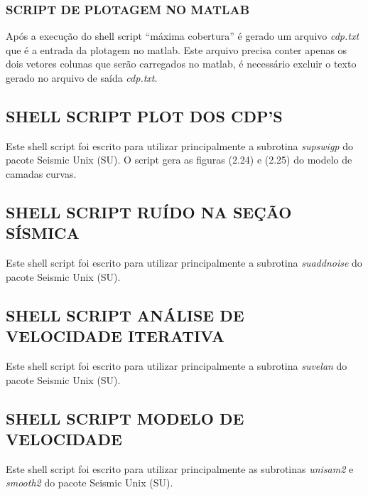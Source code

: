 \subsubsection*{SCRIPT DE PLOTAGEM NO MATLAB}
Após a execução do shell script ``máxima cobertura'' é gerado um arquivo \textit{cdp.txt} que é a entrada da plotagem no matlab. Este arquivo precisa conter apenas os dois vetores colunas que serão carregados no matlab, é necessário excluir o texto gerado no arquivo de saída \textit{cdp.txt}.


\newpage
\subsection{SHELL SCRIPT PLOT DOS CDP'S}
\label{apendice_I}
Este shell script foi escrito para utilizar principalmente a subrotina \textit{supswigp} do pacote Seismic Unix (SU).
O script gera as figuras (2.24) e (2.25) do modelo de camadas curvas.


\newpage
\subsection{SHELL SCRIPT RUÍDO NA SEÇÃO SÍSMICA}
\label{apendice_J}
Este shell script foi escrito para utilizar principalmente a subrotina \textit{suaddnoise} do pacote Seismic Unix (SU).


\newpage
\subsection{SHELL SCRIPT ANÁLISE DE VELOCIDADE ITERATIVA}
\label{apendice_K}
Este shell script foi escrito para utilizar principalmente a subrotina \textit{suvelan} do pacote Seismic Unix (SU).



\newpage
\subsection{SHELL SCRIPT MODELO DE VELOCIDADE}
\label{apendice_L}
Este shell script foi escrito para utilizar principalmente as subrotinas \textit{unisam2} e \textit{smooth2} do pacote Seismic Unix (SU).


